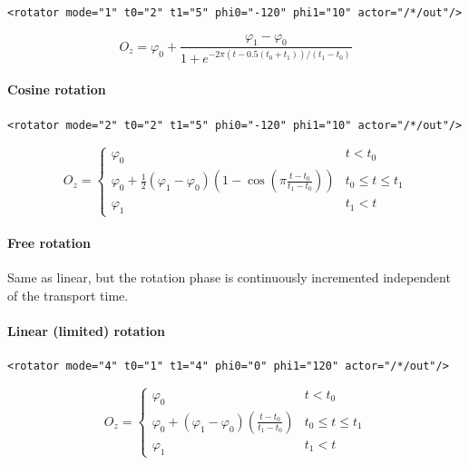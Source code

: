 \begin{lstlisting}[numbers=none]
  <rotator mode="1" t0="2" t1="5" phi0="-120" phi1="10" actor="/*/out"/>
\end{lstlisting}

\begin{equation}
O_z = \varphi_0+\frac{\varphi_1-\varphi_0}{1+e^{-2\pi (t-0.5(t_0+t_1))/(t_1-t_0)}}
\end{equation}

\paragraph{Cosine rotation}

\begin{lstlisting}[numbers=none]
  <rotator mode="2" t0="2" t1="5" phi0="-120" phi1="10" actor="/*/out"/>
\end{lstlisting}

\begin{equation}
O_z = \left\{\begin{array}{ll}
\varphi_0 & t<t_0\\
\varphi_0+\frac12(\varphi_1-\varphi_0)(1-\cos(\pi \frac{t-t_0}{t_1-t_0})) & t_0\le t \le t_1\\
\varphi_1 & t_1 < t
\end{array}\right.
\end{equation}

\paragraph{Free rotation}

Same as linear, but the rotation phase is continuously incremented
independent of the transport time.

\paragraph{Linear (limited) rotation}

\begin{lstlisting}[numbers=none]
  <rotator mode="4" t0="1" t1="4" phi0="0" phi1="120" actor="/*/out"/>
\end{lstlisting}

\begin{equation}
O_z = \left\{\begin{array}{ll}
\varphi_0 & t<t_0\\
\varphi_0+(\varphi_1-\varphi_0)(\frac{t-t_0}{t_1-t_0}) & t_0\le t \le t_1\\
\varphi_1 & t_1 < t
\end{array}\right.
\end{equation}

